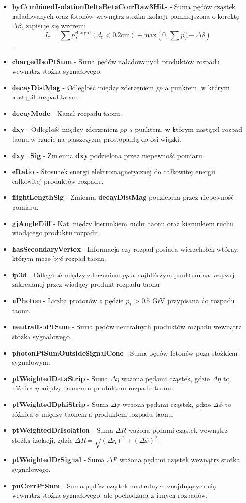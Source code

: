 \documentclass{pracalicmgr}
\begin{document}
	\begin{itemize}
	\item \textbf{byCombinedIsolationDeltaBetaCorrRaw3Hits} - Suma pędów cząstek naładowanych oraz fotonów wewnątrz stożka izolacji pomniejszona o korektę $\Delta\beta$, zapisuje się wzorem:  $$I_{\tau} = \sum p_T^{\mathrm{charged}}(d_z < 0.2 \mathrm{cm}) + \mathrm{max}(0, \sum p^{\gamma}_T - \Delta\beta)$$.
	\item \textbf{chargedIsoPtSum} - Suma pędów naładowanych produktów rozpadu wewnątrz stożka sygnałowego.
	\item \textbf{decayDistMag} - Odległość między zderzeniem $pp$ a punktem, w którym nastąpił rozpad taonu.
	\item \textbf{decayMode} - Kanał rozpadu taonu.
	\item \textbf{dxy} - Odległość między zderzeniem $pp$ a punktem, w którym nastąpił rozpad taonu w rzucie na płaszczyznę prostopadłą do osi wiązki.
	\item \textbf{dxy\_Sig} - Zmienna \textbf{dxy} podzielona przez niepewność pomiaru.
	\item \textbf{eRatio} - Stosunek energii elektromagnetycznej do całkowitej energii całkowitej produktów rozpadu.
	\item \textbf{flightLengthSig} - Zmienna \textbf{decayDistMag} podzielona przez niepewność pomiaru. 
	\item \textbf{gjAngleDiff} - Kąt między kierunkiem ruchu taonu oraz kierunkiem ruchu wiodącego produktu rozpadu.
	\item \textbf{hasSecondaryVertex} - Informacja czy rozpad posiada wierzchołek wtórny, którym może być rozpad taonu.
	\item \textbf{ip3d} - Odległość między zderzeniem $pp$ a najbliższym punktem na krzywej zakreślanej przez wiodący produkt rozpadu taonu.
	\item \textbf{nPhoton} - Liczba protonów o pędzie $p_T > 0.5$ GeV przypisana do rozpadu taonu.
	\item \textbf{neutralIsoPtSum} - Suma pędów neutralnych produktów rozpadu wewnątrz stożka sygnałowego.
	\item \textbf{photonPtSumOutsideSignalCone} - Suma pędów fotonów poza stożkiem sygnałowym.
	\item \textbf{ptWeightedDetaStrip} - Suma $\Delta\eta$ ważona pędami cząstek, gdzie $\Delta\eta$ to różnica $\eta$ między taonem a produktem rozpadu taonu.
	\item \textbf{ptWeightedDphiStrip} - Suma $\Delta\phi$ ważona pędami cząstek, gdzie $\Delta\phi$ to różnica $\phi$ między taonem a produktem rozpadu taonu.
	\item \textbf{ptWeightedDrIsolation} - Suma $\Delta R$ ważona pędami cząstek wewnątrz stożka izolacji, gdzie $\Delta R = \sqrt{(\Delta\eta)^2 + (\Delta\phi)^2}$.
	\item \textbf{ptWeightedDrSignal} - Suma $\Delta R$ ważona pędami cząstek wewnątrz stożka sygnałowego.
	\item \textbf{puCorrPtSum} - Suma pędów cząstek neutralnych znajdujących się wewnątrz stożka sygnałowego, ale pochodząca z innych rozpadów.
	\end{itemize}
	
\end{document}
